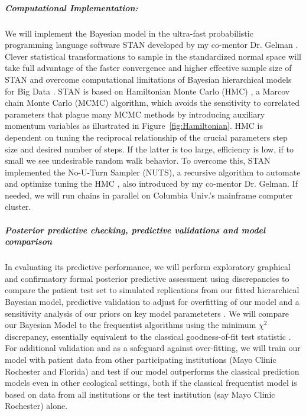 \documentclass[11pt,notitlepage]{article}
\begin{document}
\subparagraph*{Computational Implementation:}
We will implement the Bayesian model in the ultra-fast probabilistic programming language software STAN developed by my co-mentor Dr. Gelman \cite{Stan_Software_2014}. Clever statistical transformations to sample in the standardized normal space will take full advantage of the faster convergence and higher effective sample size of STAN and overcome computational limitations of Bayesian hierarchical models for Big Data \cite{Gelman-Hill_2014}. STAN  is based on Hamiltonian Monte Carlo (HMC) \cite{Gelman-Hill_2014}, a Marcov chain Monte Carlo (MCMC) algorithm, which avoids the sensitivity to correlated parameters that plague many MCMC methods by introducing auxiliary momentum variables \cite{Homan_Gelman_NUTS_2014} as illustrated in Figure~\ref{fig:Hamiltonian}. HMC is dependent  on tuning the reciprocal relationship of the crucial parameters step size and desired number of steps. If the latter is too large, efficiency is low, if to small we see undesirable random walk behavior. To overcome this, STAN implemented the No-U-Turn Sampler (NUTS), a recursive algorithm to automate and optimize tuning the HMC \cite{Homan_Gelman_NUTS_2014}, also introduced by my co-mentor Dr. Gelman. If needed, we will run chains in parallel on Columbia Univ.'s mainframe computer cluster. 

\subparagraph*{Posterior predictive checking, predictive validations and model comparison}
In evaluating its predictive performance, we will perform exploratory graphical \cite{Gelman2004posteriorpredictivechecks} and confirmatory formal posterior predictive assessment using discrepancies \cite{GelmanMengStern1996} to compare the patient test set to simulated replications from our fitted hierarchical Bayesian model, predictive validation to adjust for overfitting of our model and a sensitivity analysis of our priors on key model parameteters \cite{Gelman-Hill_2014,Gelman_predictive_2000}. We will compare our Bayesian Model to the frequentist algorithms using the minimum $\chi^{2}$ discrepancy, essentially equivalent to the classical
goodness-of-fit test statistic \cite{GelmanMengStern1996}. For additional validation and as a safeguard against over-fitting, we will train our model with patient data from other participating institutions (Mayo Clinic Rochester and Florida) and test if our model outperforms the classical prediction models even in other ecological settings, both if the classical frequentist model is based on data from all institutions or the test institution (say Mayo Clinic Rochester) alone.
\end{document}
